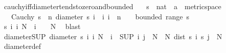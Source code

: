 \begin{isabellebody}
\ cauchy{\isacharunderscore}{\kern0pt}iff{\isacharunderscore}{\kern0pt}diameter{\isacharunderscore}{\kern0pt}tends{\isacharunderscore}{\kern0pt}to{\isacharunderscore}{\kern0pt}zero{\isacharunderscore}{\kern0pt}and{\isacharunderscore}{\kern0pt}bounded{\isacharcolon}{\kern0pt}\isanewline
\ \ \ s\ {\isacharcolon}{\kern0pt}{\isacharcolon}{\kern0pt}\ {\isachardoublequoteopen}nat\ {\isasymRightarrow}\ {\isacharprime}{\kern0pt}a\ {\isacharcolon}{\kern0pt}{\isacharcolon}{\kern0pt}\ metric{\isacharunderscore}{\kern0pt}space{\isachardoublequoteclose}\isanewline
\ \ \ {\isachardoublequoteopen}Cauchy\ s\ {\isasymlongleftrightarrow}\ {\isacharparenleft}{\kern0pt}{\isacharparenleft}{\kern0pt}{\isasymlambda}n{\isachardot}{\kern0pt}\ diameter\ {\isacharbraceleft}{\kern0pt}s\ i\ {\isacharbar}{\kern0pt}\ i{\isachardot}{\kern0pt}\ i\ {\isasymge}\ n{\isacharbraceright}{\kern0pt}{\isacharparenright}{\kern0pt}\ {\isasymlonglonglongrightarrow}\ {}\ {\isasymand}\ bounded\ {\isacharparenleft}{\kern0pt}range\ s{\isacharparenright}{\kern0pt}{\isacharparenright}{\kern0pt}{\isachardoublequoteclose}\isanewline
%
\isadelimproof
%
\endisadelimproof
%
\isatagproof
{}\isamarkupfalse%
\ {\isacharminus}{\kern0pt}\isanewline
\ \ \isamarkupfalse%
\ {\isachardoublequoteopen}{\isacharbraceleft}{\kern0pt}s\ i\ {\isacharbar}{\kern0pt}i{\isachardot}{\kern0pt}\ N\ {\isasymle}\ i{\isacharbraceright}{\kern0pt}\ {\isasymnoteq}\ {\isacharbraceleft}{\kern0pt}{\isacharbraceright}{\kern0pt}{\isachardoublequoteclose}\ \ N\ \isamarkupfalse%
\ blast\isanewline
\ \ \isamarkupfalse%
\ diameter{\isacharunderscore}{\kern0pt}SUP{\isacharcolon}{\kern0pt}\ {\isachardoublequoteopen}diameter\ {\isacharbraceleft}{\kern0pt}s\ i\ {\isacharbar}{\kern0pt}i{\isachardot}{\kern0pt}\ N\ {\isasymle}\ i{\isacharbraceright}{\kern0pt}\ {\isacharequal}{\kern0pt}\ {\isacharparenleft}{\kern0pt}SUP\ {\isacharparenleft}{\kern0pt}i{\isacharcomma}{\kern0pt}\ j{\isacharparenright}{\kern0pt}\ {\isasymin}\ {\isacharbraceleft}{\kern0pt}N{\isachardot}{\kern0pt}{\isachardot}{\kern0pt}{\isacharbraceright}{\kern0pt}\ {\isasymtimes}\ {\isacharbraceleft}{\kern0pt}N{\isachardot}{\kern0pt}{\isachardot}{\kern0pt}{\isacharbraceright}{\kern0pt}{\isachardot}{\kern0pt}\ dist\ {\isacharparenleft}{\kern0pt}s\ i{\isacharparenright}{\kern0pt}\ {\isacharparenleft}{\kern0pt}s\ j{\isacharparenright}{\kern0pt}{\isacharparenright}{\kern0pt}{\isachardoublequoteclose}\ \ N\ \isamarkupfalse%
\ diameter{\isacharunderscore}{\kern0pt}def\ \isamarkupfalse%

\end{isabellebody}
